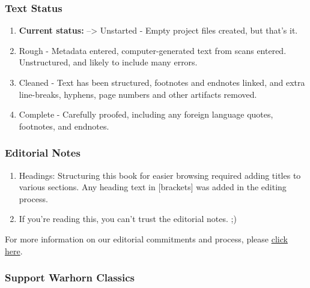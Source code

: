 \documentclass[
  english,
]{book}
\providecommand{\tightlist}{%
  \setlength{\itemsep}{0pt}\setlength{\parskip}{0pt}}
\begin{document}
\hypertarget{text-status}{%
\subsubsection*{Text Status}\label{text-status}}

\begin{enumerate}
\def\labelenumi{\arabic{enumi}.}
\setcounter{enumi}{-1}
\tightlist
\item
  \textbf{Current status:} --\textgreater{} Unstarted - Empty project files created, but that's it.
\item
  Rough - Metadata entered, computer-generated text from scans entered. Unstructured, and likely to include many errors.
\item
  Cleaned - Text has been structured, footnotes and endnotes linked, and extra line-breaks, hyphens, page numbers and other artifacts removed.
\item
  Complete - Carefully proofed, including any foreign language quotes, footnotes, and endnotes.
\end{enumerate}

\hypertarget{editorial-notes}{%
\subsubsection*{Editorial Notes}\label{editorial-notes}}

\begin{enumerate}
\def\labelenumi{\arabic{enumi}.}
\tightlist
\item
  Headings: Structuring this book for easier browsing required adding titles to various sections. Any heading text in {[}brackets{]} was added in the editing process.
\item
  If you're reading this, you can't trust the editorial notes. ;)
\end{enumerate}

For more information on our editorial commitments and process, please \href{https://classics.warhornmedia.com/editorial}{click here}.

\hypertarget{support-warhorn-classics}{%
\subsubsection*{Support Warhorn Classics}\label{support-warhorn-classics}}
\end{document}
